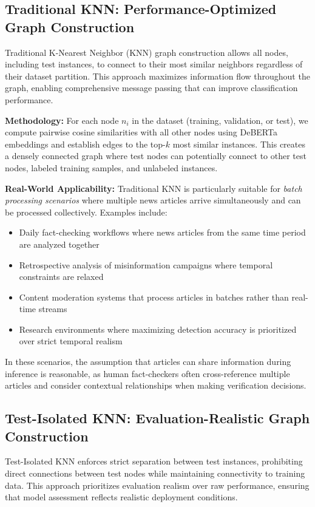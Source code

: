 \subsection{Traditional KNN: Performance-Optimized Graph Construction}

Traditional K-Nearest Neighbor (KNN) graph construction allows all nodes, including test instances, to connect to their most similar neighbors regardless of their dataset partition. This approach maximizes information flow throughout the graph, enabling comprehensive message passing that can improve classification performance.

\textbf{Methodology:} For each node $n_i$ in the dataset (training, validation, or test), we compute pairwise cosine similarities with all other nodes using DeBERTa embeddings and establish edges to the top-$k$ most similar instances. This creates a densely connected graph where test nodes can potentially connect to other test nodes, labeled training samples, and unlabeled instances.

\textbf{Real-World Applicability:} Traditional KNN is particularly suitable for \emph{batch processing scenarios} where multiple news articles arrive simultaneously and can be processed collectively. Examples include:
\begin{itemize}
    \item Daily fact-checking workflows where news articles from the same time period are analyzed together
    \item Retrospective analysis of misinformation campaigns where temporal constraints are relaxed
    \item Content moderation systems that process articles in batches rather than real-time streams
    \item Research environments where maximizing detection accuracy is prioritized over strict temporal realism
\end{itemize}

In these scenarios, the assumption that articles can share information during inference is reasonable, as human fact-checkers often cross-reference multiple articles and consider contextual relationships when making verification decisions.

\subsection{Test-Isolated KNN: Evaluation-Realistic Graph Construction}

Test-Isolated KNN enforces strict separation between test instances, prohibiting direct connections between test nodes while maintaining connectivity to training data. This approach prioritizes evaluation realism over raw performance, ensuring that model assessment reflects realistic deployment conditions.

